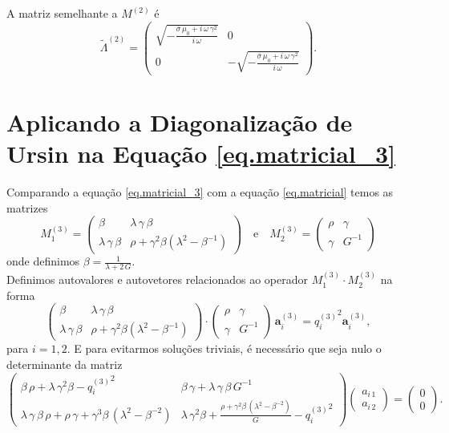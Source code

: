 A matriz semelhante a $M^{(2)}$ \'e
\begin{equation*}
\tilde{\Lambda}^{(2)}=
\begin{pmatrix}
\sqrt{-\frac{\overline{\sigma}\,\mu_0+i\,\omega\,\gamma^2}{i\,\omega}}&0\\
0&-\sqrt{-\frac{\overline{\sigma}\,\mu_0+i\,\omega\,\gamma^2}{i\,\omega}}
\end{pmatrix}.
\end{equation*}

\section{Aplicando a Diagonaliza\c{c}\~ao de Ursin na Equa\c{c}\~ao \ref{eq.matricial_3}}\label{sec.diagonalizacao_3}

Comparando a equa\c{c}\~ao \ref{eq.matricial_3} com a equa\c{c}\~ao \ref{eq.matricial} temos as matrizes
\begin{equation*}
M^{(3)}_1=
\begin{pmatrix}
\beta&\lambda\,\gamma\,\beta\\
\lambda\,\gamma\,\beta&\rho+\gamma^2\beta(\lambda^2-\beta^{-1})
\end{pmatrix}
\quad\text{e}\quad
M^{(3)}_2=
\begin{pmatrix}
\rho&\gamma\\
\gamma&G^{-1}
\end{pmatrix}
\end{equation*}
onde definimos $\beta=\frac{1}{\lambda+2\,G}$.\\
Definimos autovalores e autovetores relacionados ao operador $M^{(3)}_1\cdot M^{(3)}_2$ na forma
\begin{equation*}
\begin{pmatrix}
\beta&\lambda\,\gamma\,\beta\\
\lambda\,\gamma\,\beta&\rho+\gamma^2\beta(\lambda^2-\beta^{-1})
\end{pmatrix}
\cdot
\begin{pmatrix}
\rho&\gamma\\
\gamma&G^{-1}
\end{pmatrix}
\,\mathbf{a}^{(3)}_i
=
{q^{(3)}_i}^2\mathbf{a}^{(3)}_i,
\end{equation*}
para $i=1,2$.  E para evitarmos solu\c{c}\~oes triviais, \'e necess\'ario que seja nulo o determinante da matriz
\begin{equation}\label{eq.def_auto_3}
\begin{pmatrix}
\beta\,\rho+\lambda\,\gamma^2\beta-{q^{(3)}_i}^2&\beta\,\gamma+\lambda\,\gamma\,\beta\,G^{-1}\\
\lambda\,\gamma\,\beta\,\rho+\rho\,\gamma+\gamma^3\beta\,(\lambda^2-\beta^{-2})&\lambda\,\gamma^2\beta+\frac{\rho+\gamma^2\beta\,(\lambda^2-\beta^{-2})}{G}-{q^{(3)}_i}^2
\end{pmatrix}
\begin{pmatrix}
a_{i\,1}\\
a_{i\,2}
\end{pmatrix}
=
\begin{pmatrix}
0\\
0
\end{pmatrix}.
\end{equation}

